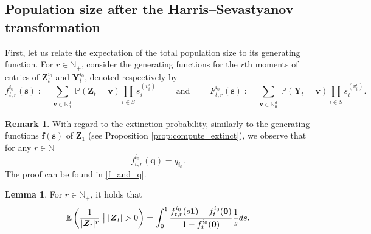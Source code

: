 \documentclass[preprint,3p,12pt]{elsarticle}
\theoremstyle{definition}
\newtheorem{lemma}{Lemma}
\newtheorem*{remark}{Remark}
\begin{document}
\subsection{Population size after the Harris--Sevastyanov transformation}
First, let us relate the expectation of the total population size to its generating function. For $r \in \mathbb{N}_+$, consider the generating functions for the $r$th moments of entries of $\boldsymbol{Z}_t^{i_0}$ and $\boldsymbol{Y}_t^{i_0}$, denoted respectively by
\begin{equation*}
    f_{t,r}^{i_0}(\boldsymbol{s}) := \sum_{\substack{\boldsymbol{v} \in \mathbb{N}_0^{d} {}}} \mathbb{P}(\boldsymbol{Z}_t = \boldsymbol{v}) \prod_{i \in S} s_i^{(v_i^r)} \qquad \text{ and } 
    \qquad F_{t,r}^{i_0}(\boldsymbol{s}) := \sum_{\substack{\boldsymbol{v} \in \mathbb{N}_0^{d} {}}} \mathbb{P}(\boldsymbol{Y}_t = \boldsymbol{v}) \prod_{i \in S} s_i^{(v_i^r)}.
\end{equation*}
\begin{remark}
    With regard to the extinction probability, similarly to the generating functions $\boldsymbol{f}(\boldsymbol{s})$ of $\boldsymbol{Z}_1$ (see Proposition \ref{prop:compute_extinct}), we observe that for any $r \in \mathbb{N}_+$
    \begin{equation} \label{eq:fixed_point}
        f_{t,r}^{i_0}(\boldsymbol{q}) = q_{i_0}.
    \end{equation}
    The proof can be found in \ref{f_and_q}.
\end{remark}
\begin{lemma} \label{generating}
For $r \in \mathbb{N}_+$, it holds that
\begin{equation*}
 \mathbb{E}\left(\frac{1}{|\boldsymbol{Z}_t|^r}\bigm| |\boldsymbol{Z}_t| > 0\right) = \int_0^1 \frac{f_{t, r}^{i_0}(s\boldsymbol{1})-f_t^{i_0}(\boldsymbol{0})}{1-f_t^{i_0}(\boldsymbol{0})} \frac{1}{s}ds.
\end{equation*}
\end{lemma}
\end{document}

